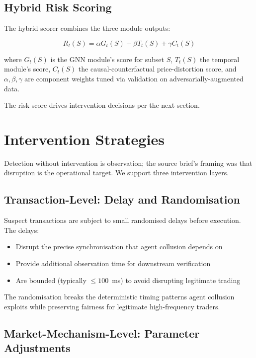 \documentclass[sigconf,nonacm]{acmart}
\begin{document}
\subsection{Hybrid Risk Scoring}

The hybrid scorer combines the three module outputs:

\begin{equation}
  R_t(S) = \alpha G_t(S) + \beta T_t(S) + \gamma C_t(S)
\end{equation}

where $G_t(S)$ is the GNN module's score for subset $S$, $T_t(S)$
the temporal module's score, $C_t(S)$ the causal-counterfactual
price-distortion score, and $\alpha, \beta, \gamma$ are component
weights tuned via validation on adversarially-augmented data.

The risk score drives intervention decisions per the next section.

\section{Intervention Strategies}

Detection without intervention is observation; the source brief's
framing was that disruption is the operational target. We support
three intervention layers.

\subsection{Transaction-Level: Delay and Randomisation}

Suspect transactions are subject to small randomised delays before
execution. The delays:

\begin{itemize}
  \item Disrupt the precise synchronisation that agent collusion
        depends on
  \item Provide additional observation time for downstream
        verification
  \item Are bounded (typically $\leq 100$~ms) to avoid disrupting
        legitimate trading
\end{itemize}

The randomisation breaks the deterministic timing patterns
agent collusion exploits while preserving fairness for legitimate
high-frequency traders.

\subsection{Market-Mechanism-Level: Parameter Adjustments}
\end{document}
